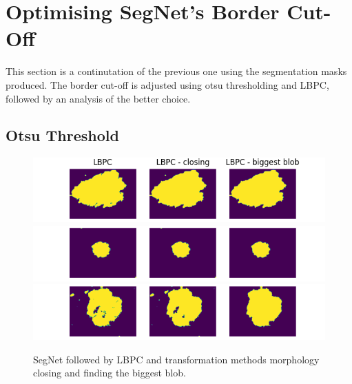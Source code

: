 


\section{Optimising SegNet's Border Cut-Off}
This section is a continutation of the previous one using the segmentation masks produced. The border cut-off is adjusted using otsu thresholding and LBPC, followed by an analysis of the better choice.

\subsection{Otsu Threshold}

\begin{figure}[]
    \centering
    \includegraphics[scale=0.8]{images/segmentation/LBPC-1.png}
    \includegraphics[scale=0.8]{images/segmentation/LBPC-2.png}
    \includegraphics[scale=0.8]{images/segmentation/LBPC-3.png}
    \caption{SegNet followed by LBPC and transformation methods morphology closing and finding the biggest blob.}\label{SegNet-examples}
\end{figure}

